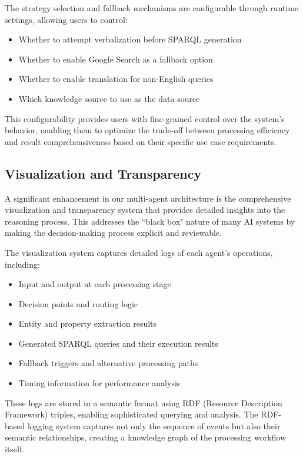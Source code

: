 The strategy selection and fallback mechanisms are configurable through runtime settings, allowing users to control:

\begin{itemize}
    \item Whether to attempt verbalization before SPARQL generation
    \item Whether to enable Google Search as a fallback option
    \item Whether to enable translation for non-English queries
    \item Which knowledge source to use as the data source
\end{itemize}

This configurability provides users with fine-grained control over the system's behavior, enabling them to optimize the trade-off between processing efficiency and result comprehensiveness based on their specific use case requirements.

\subsection{Visualization and Transparency}
\label{vis-transparency}
A significant enhancement in our multi-agent architecture is the comprehensive visualization and transparency system that provides detailed insights into the reasoning process. This addresses the ``black box" nature of many AI systems by making the decision-making process explicit and reviewable.

The visualization system captures detailed logs of each agent's operations, including:

\begin{itemize}
    \item Input and output at each processing stage
    \item Decision points and routing logic
    \item Entity and property extraction results
    \item Generated SPARQL queries and their execution results
    \item Fallback triggers and alternative processing paths
    \item Timing information for performance analysis
\end{itemize}

These logs are stored in a semantic format using RDF (Resource Description Framework) triples, enabling sophisticated querying and analysis. The RDF-based logging system captures not only the sequence of events but also their semantic relationships, creating a knowledge graph of the processing workflow itself.

